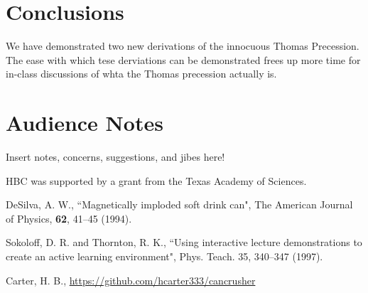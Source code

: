 \documentclass[prb,preprint]{revtex4-1}
\begin{document}
\section{Conclusions}
We have demonstrated two new derivations of the innocuous Thomas Precession.  The ease with which tese derviations can be demonstrated frees up more time for in-class discussions of whta the Thomas precession actually is.

\section{Audience Notes}
Insert notes, concerns, suggestions, and jibes here!

\begin{acknowledgments}
HBC was supported by a grant from the Texas Academy of Sciences.\end{acknowledgments}

\begin{thebibliography}{99}

 DeSilva, A. W., ``Magnetically imploded soft drink can", The American Journal of Physics, \textbf{62}, 41--45 (1994).  

 Sokoloff, D. R. and Thornton, R. K., ``Using interactive lecture demonstrations to create an active learning environment", Phys. Teach. 35, 340--347 (1997).  

 Carter, H. B., \url{https://github.com/hcarter333/cancrusher}


\end{thebibliography}


\end{document}
